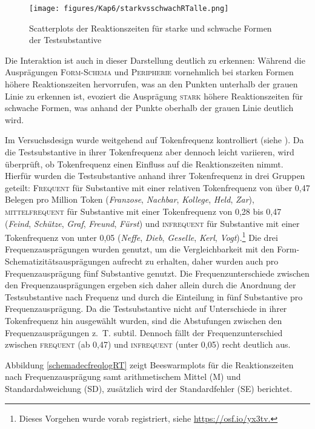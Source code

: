 \begin{figure}
\texttt{[image: figures/Kap6/starkvsschwachRTalle.png]} 
\caption{Scatterplots der Reaktionszeiten für starke und schwache Formen der Testsubstantive}
\label{schemadecscatter}
\end{figure}

Die Interaktion ist auch in dieser Darstellung deutlich zu erkennen: Während die Ausprägungen \textsc{Form-Schema} und \textsc{Peripherie} vornehmlich bei starken Formen höhere Reaktionszeiten hervorrufen, was an den Punkten unterhalb der grauen Linie zu erkennen ist, evoziert die Ausprägung \textsc{stark} höhere Reaktionszeiten für schwache Formen, was anhand der Punkte oberhalb der grauen Linie deutlich wird.

Im Versuchsdesign wurde weitgehend auf Tokenfrequenz kontrolliert (siehe ). Da die Testsubstantive in ihrer Tokenfrequenz aber dennoch leicht variieren, wird überprüft, ob Tokenfrequenz einen Einfluss auf die Reaktionszeiten nimmt. Hierfür wurden die Testsubstantive anhand ihrer Tokenfrequenz in drei Gruppen geteilt: \textsc{Frequent} für Substantive mit einer relativen Tokenfrequenz von über 0,47 Belegen pro Million Token (\textit{Franzose}, \textit{Nachbar}, \textit{Kollege}, \textit{Held}, \textit{Zar}), \textsc{mittelfrequent} für Substantive mit einer Tokenfrequenz von 0,28 bis 0,47 (\textit{Feind}, \textit{Schütze}, \textit{Graf}, \textit{Freund}, \textit{Fürst}) und \textsc{infrequent} für Substantive mit einer Tokenfrequenz von unter 0,05 (\textit{Neffe}, \textit{Dieb}, \textit{Geselle}, \textit{Kerl}, \textit{Vogt}).\footnote{Dieses Vorgehen wurde vorab registriert, siehe \url{https://osf.io/yx3tv.}} Die drei Frequenzausprägungen wurden genutzt, um die Vergleichbarkeit mit den Form-Schematizitätsausprägungen aufrecht zu erhalten, daher wurden auch pro Frequenzausprägung fünf Substantive genutzt. Die Frequenzunterschiede zwischen den Frequenzausprägungen ergeben sich daher allein durch die Anordnung der Testsubstantive nach Frequenz und durch die Einteilung in fünf Substantive pro Frequenzausprägung. Da die Testsubstantive nicht auf Unterschiede in ihrer Tokenfrequenz hin ausgewählt wurden, sind die Abstufungen zwischen den Frequenzausprägungen z.~T. subtil. Dennoch fällt der Frequenzunterschied zwischen \textsc{frequent} (ab 0,47) und \textsc{infrequent} (unter 0,05) recht deutlich aus.  


Abbildung \ref{schemadecfreqlogRT} zeigt Beeswarmplots für die Reaktionszeiten nach Frequenzausprägung samt arithmetischem Mittel (M) und Standardabweichung (SD), zusätzlich wird der Standardfehler (SE) berichtet.

